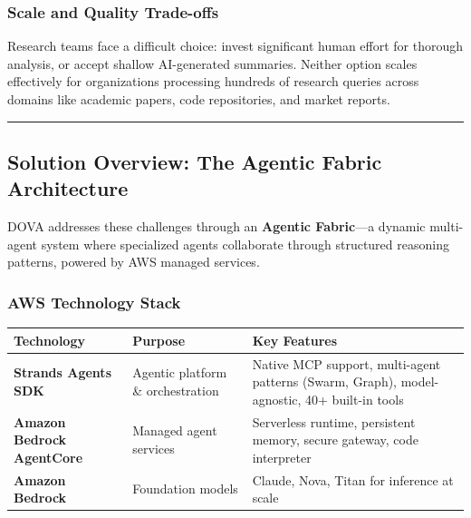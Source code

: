 \subsubsection{Scale and Quality
Trade-offs}\label{scale-and-quality-trade-offs}

Research teams face a difficult choice: invest significant human effort
for thorough analysis, or accept shallow AI-generated summaries. Neither
option scales effectively for organizations processing hundreds of
research queries across domains like academic papers, code repositories,
and market reports.

\begin{center}\rule{0.5\linewidth}{0.5pt}\end{center}

\subsection{Solution Overview: The Agentic Fabric
Architecture}\label{solution-overview-the-agentic-fabric-architecture}

DOVA addresses these challenges through an \textbf{Agentic Fabric}---a
dynamic multi-agent system where specialized agents collaborate through
structured reasoning patterns, powered by AWS managed services.

\subsubsection{AWS Technology Stack}\label{aws-technology-stack}

{\def\LTcaptype{none} %
\begin{longtable}[]{@{}
  >{\raggedright\arraybackslash}p{}
  >{\raggedright\arraybackslash}p{}
  >{\raggedright\arraybackslash}p{}@{}}
\toprule\noalign{}
\begin{minipage}[b]{\linewidth}\raggedright
Technology
\end{minipage} & \begin{minipage}[b]{\linewidth}\raggedright
Purpose
\end{minipage} & \begin{minipage}[b]{\linewidth}\raggedright
Key Features
\end{minipage} \\
\midrule\noalign{}
\endhead
\bottomrule\noalign{}
\endlastfoot
\textbf{Strands Agents SDK} & Agentic platform \& orchestration & Native
MCP support, multi-agent patterns (Swarm, Graph), model-agnostic, 40+
built-in tools \\
\textbf{Amazon Bedrock AgentCore} & Managed agent services & Serverless
runtime, persistent memory, secure gateway, code interpreter \\
\textbf{Amazon Bedrock} & Foundation models & Claude, Nova, Titan for
inference at scale \\
\end{longtable}
}

